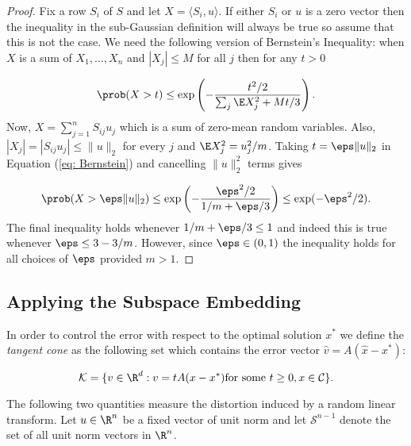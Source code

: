 \begin{proof}
  Fix a row $S_i$ of $S$ and let $X = \langle S_i, u \rangle$.
  If either $S_i$ or $u$ is a zero vector then the
  inequality in the sub-Gaussian definition will always be true so assume that
  this is not the case.
  We need the following version of Bernstein's Inequality:
  when $X$ is a sum of $X_1,\ldots,X_n$ and $|X_j| \le M$ for all $j$ then for
  any $t > 0$

  \begin{equation} \label{eq: Bernstein}
    \prob (X > t) \le \exp \left( - \frac{t^2 / 2}{\sum_j \E X_j^2 + Mt/3
    } \right).
  \end{equation}
  Now, $X = \sum_{j=1}^n S_{ij} u_j$ which is a sum of zero-mean random variables.
  Also, $|X_j| = |S_{ij} u_j| \le \| u \|_2$ for every $j$ and $\E X_j^2 =
  u_j^2/m$.
  Taking $t = \eps \| u \|_2$ in Equation (\ref{eq: Bernstein}) and cancelling
  $\| u \|_2^2$ terms gives

  \begin{equation} \label{eq: countsketch_bernstein}
    \prob (X > \eps \| u \|_2) \le \exp \left( - \frac{\eps^2 /
    2}{1/m + \eps /3 } \right)
    \le \exp(-\eps^2/2).
  \end{equation}
  The final inequality holds whenever $1/m + \eps / 3 \le 1$ and indeed this is
  true whenever $\eps \le 3 - 3/m$.
  However, since $\eps \in (0,1)$ the inequality holds
  for all choices of $\eps$ provided $m>1$.

\end{proof}

\subsection{Applying the Subspace Embedding}
In order to control the error with respect to the optimal solution $x^*$ we
define the \textit{tangent cone} as the following set which contains the error
vector $\hat{v} = A(\hat{x} - x^*)$:

  \begin{equation} \label{eq: tangent-cone}
    \mathcal{K} = \{ v \in \R^d : v = tA(x - x^*) \text{for some $t \ge 0$}, x\in \mathcal{C} \}.
  \end{equation}

\noindent The following two quantities measure the distortion induced by a random linear
transform.
Let $u \in \R^n$ be a fixed vector of unit norm and let $\mathcal{S}^{n-1}$ denote
the set of all unit norm vectors in $\R^n$.

